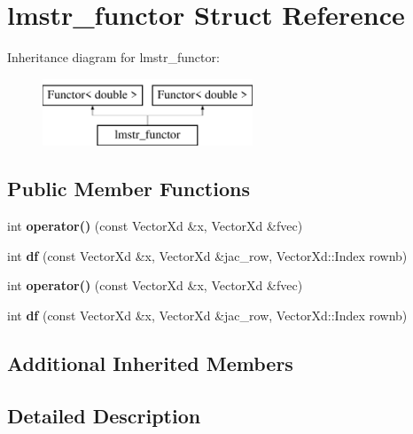 \hypertarget{structlmstr__functor}{}\section{lmstr\+\_\+functor Struct Reference}
\label{structlmstr__functor}
Inheritance diagram for lmstr\+\_\+functor\+:\begin{figure}[H]
\begin{center}
\leavevmode
\includegraphics[height=2.000000cm]{structlmstr__functor}
\end{center}
\end{figure}
\subsection*{Public Member Functions}
\begin{DoxyCompactItemize}
\item 
\mbox{\label{structlmstr__functor_a72b868b0d28d779ef2cd850d8c5831fd}} 
int {\bfseries operator()} (const Vector\+Xd \&x, Vector\+Xd \&fvec)
\item 
\mbox{\label{structlmstr__functor_a02ee7da0798539ee2c7306463cd80ba3}} 
int {\bfseries df} (const Vector\+Xd \&x, Vector\+Xd \&jac\+\_\+row, Vector\+Xd\+::\+Index rownb)
\item 
\mbox{\label{structlmstr__functor_a72b868b0d28d779ef2cd850d8c5831fd}} 
int {\bfseries operator()} (const Vector\+Xd \&x, Vector\+Xd \&fvec)
\item 
\mbox{\label{structlmstr__functor_a02ee7da0798539ee2c7306463cd80ba3}} 
int {\bfseries df} (const Vector\+Xd \&x, Vector\+Xd \&jac\+\_\+row, Vector\+Xd\+::\+Index rownb)
\end{DoxyCompactItemize}
\subsection*{Additional Inherited Members}


\subsection{Detailed Description}


